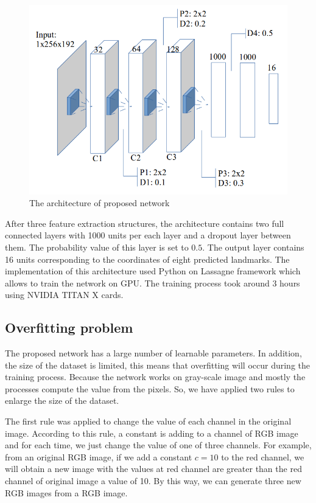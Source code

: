 \documentclass[conference]{IEEEtran}
\begin{document}
\begin{figure}[htbp]
	\centerline{\includegraphics[scale=0.3]{images/architecture}}
	\caption{The architecture of proposed network}
	\label{figarch}
\end{figure}

After three feature extraction structures, the architecture contains two full connected layers with 1000 units per each layer and a dropout layer between them. The probability value of this layer is set to $0.5$. The output layer contains 16 units corresponding to the coordinates of eight predicted landmarks. The implementation of this architecture used Python on Lassagne framework\cite{lasagne} which allows to train the network on GPU. The training process took around 3 hours using NVIDIA TITAN X cards.
\subsection{Overfitting problem}
The proposed network has a large number of learnable parameters. In addition, the size of the dataset is limited, this means that overfitting will occur during the training process. Because the network works on  gray-scale image and mostly the processes compute the value from the pixels. So, we have applied two rules to enlarge the size of the dataset.

The first rule was applied to change the value of each channel in the original image. According to this rule, a constant is adding to a channel of RGB image and for each time, we just change the value of one of three channels. For example, from an original RGB image, if we add a constant $c = 10$ to the red channel, we will obtain a new image with the values at red channel are greater than the red channel of original image a value of 10. By this way, we can generate three new RGB images from a RGB image.
\end{document}
